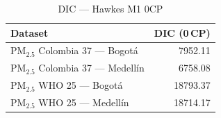 \begin{table}[htbp]
\centering
\caption{DIC --- Hawkes M1 0CP}
\label{tab:hawkes_dic_0cp}
\begin{tabular}{lr}
\toprule
Dataset & DIC (0\,CP) \\
\midrule
PM$_{2.5}$ Colombia 37 --- Bogot\'{a} & 7952.11 \\
PM$_{2.5}$ Colombia 37 --- Medell\'{i}n & 6758.08 \\
PM$_{2.5}$ WHO 25 --- Bogot\'{a} & 18793.37 \\
PM$_{2.5}$ WHO 25 --- Medell\'{i}n & 18714.17 \\
\bottomrule
\end{tabular}
\end{table}

